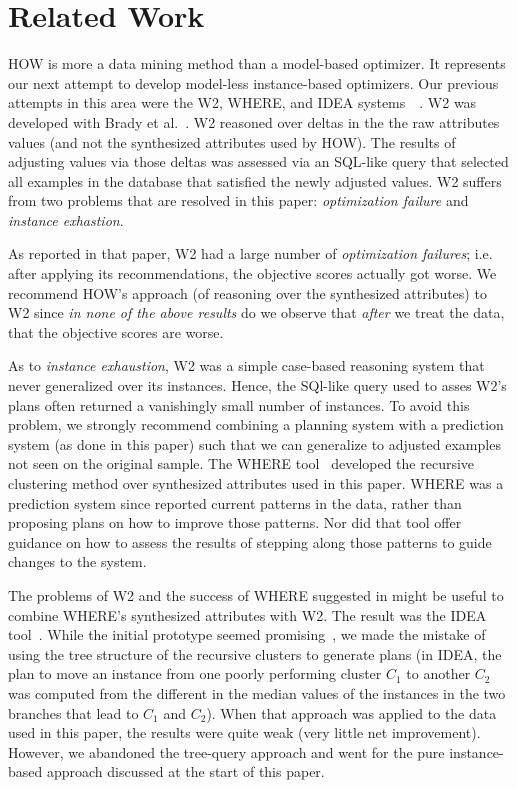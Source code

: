

\section{Related Work}

 

HOW is more a data mining method than a model-based optimizer. It represents our next attempt
to develop model-less instance-based optimizers.  Our previous attempts in this area
were the W2, WHERE, and IDEA systems~~\cite{menzies13:brady,Menzies2013:local,me12c}.
W2 was developed with Brady et al.~\cite{menzies13:brady}. 
W2 reasoned over deltas in the the raw
attributes values (and not the synthesized attributes used by HOW). 
The results of  adjusting values via those deltas was assessed via an SQL-like
query that selected all examples in the database that satisfied the newly adjusted
values. W2 suffers from two problems that are resolved
in this paper: {\em optimization failure} and {\em instance exhastion}.
\bi
\item 
As reported in that paper, W2
had a large number of {\em optimization failures}; i.e. after applying its recommendations,
the objective scores actually got worse. We recommend HOW's approach (of reasoning
over the synthesized attributes) to W2 since {\em in none of the above
results} do we observe that {\em after} we treat the data, that the objective scores are worse.
\item
As to {\em instance exhaustion}, W2 was a simple case-based reasoning system that never generalized
over its instances. Hence, the SQl-like query used to asses W2's plans often returned
a vanishingly small number of instances. To avoid this problem, we strongly recommend
combining a planning system with a prediction system (as done in this paper) such that we can
generalize to adjusted examples not seen on the original sample.
\ei
The WHERE tool~\cite{Menzies2013:local} developed the recursive clustering method over synthesized attributes
  used in this paper. WHERE was   a prediction
system since reported current patterns in the data, rather than proposing plans
on how to improve those patterns. Nor did that tool offer guidance on how to assess
the results of stepping along those patterns to guide changes to the system.

The problems of W2 and the success of WHERE suggested in might be useful to combine
WHERE's synthesized attributes with W2. The result was the IDEA tool~\cite{me12c}. 
While the initial prototype seemed promising~\cite{me12c}, we made the mistake of using
the tree structure of the recursive clusters to generate plans (in IDEA, the plan to
move an instance from one poorly performing cluster $C_1$ to another $C_2$ was computed
from the different in the  median
values of the instances in the two  branches that lead to $C_1$ and $C_2$).  When
that approach was applied to the data used in this paper, the results were quite weak
(very little net improvement). However, we abandoned the tree-query approach
and went for the pure instance-based approach discussed at the start of this paper.


